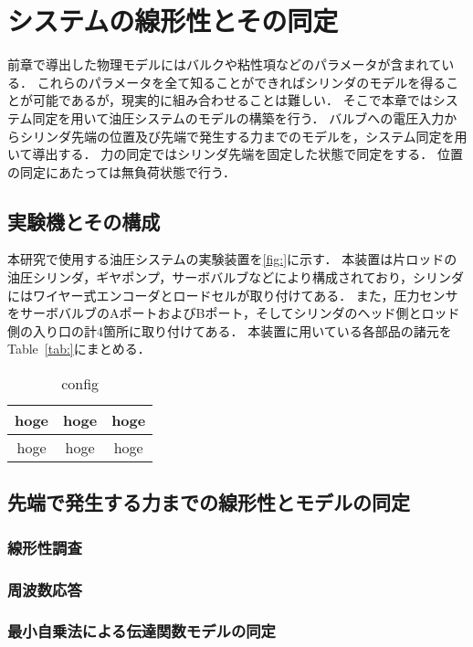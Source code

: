 \chapter{システムの線形性とその同定}
前章で導出した物理モデルにはバルクや粘性項などのパラメータが含まれている．
これらのパラメータを全て知ることができればシリンダのモデルを得ることが可能であるが，現実的に組み合わせることは難しい．
そこで本章ではシステム同定を用いて油圧システムのモデルの構築を行う．
バルブへの電圧入力からシリンダ先端の位置及び先端で発生する力までのモデルを，システム同定を用いて導出する．
力の同定ではシリンダ先端を固定した状態で同定をする．
位置の同定にあたっては無負荷状態で行う．
\section{実験機とその構成}
本研究で使用する油圧システムの実験装置を\figurename\ref{fig:}に示す．
本装置は片ロッドの油圧シリンダ，ギヤポンプ，サーボバルブなどにより構成されており，シリンダにはワイヤー式エンコーダとロードセルが取り付けてある．
また，圧力センサをサーボバルブのAポートおよびBポート，そしてシリンダのヘッド側とロッド側の入り口の計4箇所に取り付けてある．
本装置に用いている各部品の諸元をTable~\ref{tab:}にまとめる．

\begin{table}[t]
    \centering
    \begin{tabular}{c|cc}
        \hline
        hoge & hoge &hoge\\ \hline \hline
        hoge & hoge & hoge
    \end{tabular}
    \caption{config}
\end{table}


\section{先端で発生する力までの線形性とモデルの同定}
\subsection{線形性調査}
\subsection{周波数応答}
\subsection{最小自乗法による伝達関数モデルの同定}
